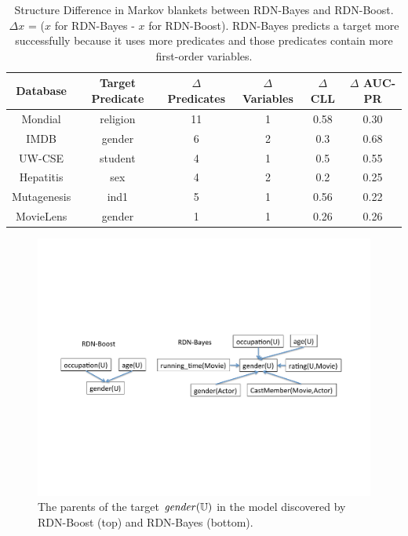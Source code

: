 \documentclass[runningheads,a4paper]{llncs}
\begin{document}
\begin{table}[!htb]
 \caption{Structure Difference in Markov blankets between RDN-Bayes and RDN-Boost. $\Delta x$ = ($x$ for RDN-Bayes - $x$ for RDN-Boost).  RDN-Bayes predicts a target more successfully because it uses more  predicates and those predicates contain more first-order variables.}
      \centering
\begin{tabular}{|c|c|c|c|c|c|}
\hline
Database & Target  Predicate & $\Delta$ Predicates  & $\Delta$ Variables & $\Delta$ CLL & $\Delta$ AUC-PR \\\hline
Mondial & religion & 11 & 1 & 0.58 & 0.30\\\hline
IMDB & gender & 6 & 2 & 0.3 & 0.68 \\\hline
UW-CSE & student & 4 & 1 & 0.5 & 0.55 \\\hline
Hepatitis & sex & 4 & 2 & 0.2 & 0.25\\\hline
Mutagenesis & ind1 & 5 & 1 & 0.56 & 0.22 \\\hline
MovieLens & gender & 1 & 1 & 0.26 & 0.26 \\\hline
\end{tabular}
 \label{table:mb-comparison}%
\end{table}%
 
\begin{figure}[htbp]
\begin{center}
\includegraphics[width=1\textwidth]{figures/dn-structure}
\caption{The parents of the target $\it{gender}(\mathbb{U})$ in the model discovered by RDN-Boost (top) and RDN-Bayes (bottom). \label{fig:dn-structure}}
\end{center}
\end{figure}
\end{document}
